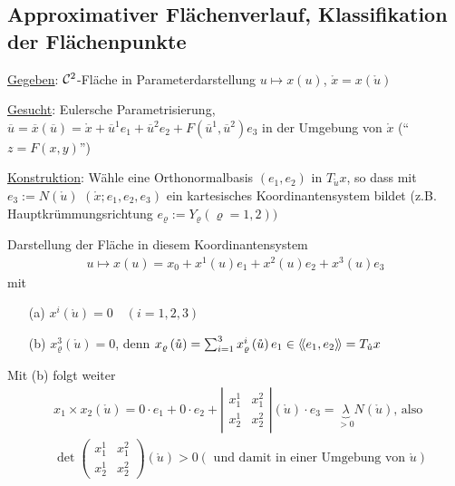 \subsection{Approximativer Flächenverlauf, Klassifikation der Flächenpunkte}
\uline{Gegeben}: \(\mathcal{C}^2\)-Fläche in Parameterdarstellung \(u \mapsto x(u)\), \(\mathring{x} = x(\mathring{u})\) \par
\uline{Gesucht}: Eulersche Parametrisierung, \(\overline u = \overline x(\overline u) = \mathring{x}+ \overline u^1 e_1 + \overline u^2 e_2 + F(\overline u^1, \overline u^2) e_3\) in der Umgebung von \(\mathring x\) \quad ("`\(z = F(x,y)\)"') \par
\uline{Konstruktion}: Wähle eine Orthonormalbasis \((e_1, e_2)\) in \(T_{\mathring u}x\), so dass mit \(e_3 := N\left(\mathring u\right)\) \(\left(\mathring x; e_1, e_2, e_3\right)\) ein kartesisches Koordinantensystem bildet (z.B. Hauptkrümmungsrichtung \(e_\varrho := Y_\varrho (\varrho = 1,2))\) \par
Darstellung der Fläche in diesem Koordinantensystem
\begin{align*}
 u \mapsto x(u) = x_0 + x^1(u) e_1 + x^2(u) e_2 + x^3(u) e_3
\end{align*}
mit
\begin{enumerate}
 \item[(a)] \(x^i \left(\mathring u\right) = 0 \quad (i = 1,2,3)\)
 \item[(b)] \(x^3_\varrho\left(\mathring u\right) = 0\), denn \(x_\varrho \left(\mathring u\right) = \sum_{i = 1}^3 x^i_\varrho \left(\mathring u\right) e_1 \in \left\langle\!\left\langle e_1, e_2\right\rangle\!\right\rangle = T_{\mathring u}x\)
\end{enumerate}
Mit (b) folgt weiter
\begin{align*}
 &x_1 \times x_2 \left(\mathring u\right) = 0 \cdot e_1 + 0 \cdot e_2 + \left|\begin{matrix}
                                                                     x_1^1 & x_1^2 \\
                                                                     x_2^1 & x_2^2
                                                                    \end{matrix}\right|\left(\mathring u\right) \cdot e_3 = \underbrace{\lambda}_{> 0} N\left(\mathring u \right)\text{, also}\\
&\det \begin{pmatrix}
      x_1^1 & x_1^2 \\
      x_2^1 & x_2^2
     \end{pmatrix} \left(\mathring u\right) > 0 (\text{ und damit in einer Umgebung von } \mathring u)
\end{align*}

